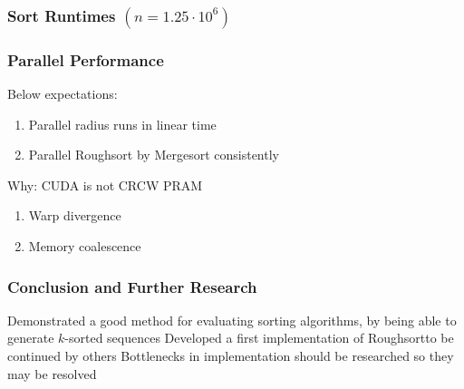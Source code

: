 \documentclass[10pt, xcolor={dvipsnames}, aspectratio=169]{beamer}
\begin{document}
\begin{frame}
\frametitle{Sort Runtimes $(n = 1.25 \cdot 10^6)$}
\begin{figure}
\scalebox{0.4}{}
\end{figure}
\end{frame}

\begin{frame}
\frametitle{Parallel Performance}
Below expectations:
\begin{enumerate}
	\item Parallel radius runs in linear time
	\item Parallel Roughsort by Mergesort consistently
\end{enumerate}
Why: CUDA is not CRCW PRAM
\begin{enumerate}
	\item Warp divergence
	\item Memory coalescence
\end{enumerate}
\end{frame}

\begin{frame}
\frametitle{Conclusion and Further Research}
Demonstrated a good method for evaluating sorting algorithms, by being able to generate $k$-sorted sequences
\newline\newline
Developed a first implementation of Roughsort\textemdash to be continued by others
\newline\newline
Bottlenecks in implementation should be researched so they may be resolved
\end{frame}
\end{document}
